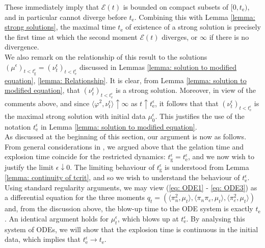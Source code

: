 \documentclass[11pt, notitlepage]{article}
\begin{document}
\begin{equation}
\end{equation} These immediately imply that $\mathcal{E}(t)$ is bounded on compact subsets of $[0, t_\mathrm{e})$, and in particular cannot diverge before $t_\mathrm{e}$. Combining this with Lemma \ref{lemma: strong solutions}, the maximal time $t_\mathrm{e}$ of existence of a strong solution is precisely the first time at which the second moment $\mathcal{E}(t)$ diverges, or $\infty$ if there is no divergence. \medskip \\ We also remark on the relationship of this result to the solutions $(\mu^\epsilon)_{t<t_\mathrm{g}^\epsilon}=(\nu^\epsilon_t)_{t<t_\mathrm{e}^\epsilon}$ discussed in Lemmas \ref{lemma: solution to modified equation}, \ref{lemma: Relationship}. It is clear, from Lemma \ref{lemma: solution to modified equation}, that $(\nu^\epsilon_t)_{t<t_\mathrm{e}^\epsilon}$ is a strong solution. Moreover, in view of the comments above, and since $\langle \varphi^2, \nu^\epsilon_t\rangle \uparrow \infty$ as $t\uparrow t_\mathrm{e}^\epsilon$, it follows that that $(\nu^{\epsilon}_t)_{t<t_\mathrm{e}^\epsilon}$ is the maximal strong solution with initial data $\mu^\epsilon_0.$ This justifies the use of the notation $t^\epsilon_\mathrm{e}$ in Lemma \ref{lemma: solution to modified equation}. \bigskip \\  As discussed at the beginning of this section, our argument is now as follows. From general considerations in \cite{N00}, we argued above that the gelation time and explosion time coincide for the restricted dynamics: $t_\mathrm{g}^\epsilon=t_\mathrm{e}^\epsilon$, and we now wish to justify the limit $\epsilon\downarrow 0$. The limiting behaviour of $t^\epsilon_\mathrm{g}$ is understood from Lemma \ref{lemma: continuity of tcrit}, and so we wish to understand the behaviour of $t_\mathrm{e}^\epsilon.$ \medskip \\  Using standard regularity arguments, we may view (\ref{eq: ODE1} - \ref{eq: ODE3}) as a differential equation for the three moments $q_t=(\langle \pi_n^2, \mu_t\rangle, \langle \pi_n \pi_e, \mu_t\rangle, \langle \pi_e^2, \mu_t\rangle)$ and, from the discussion above, the blow-up time to the ODE system is exactly $t_\mathrm{e}$. An identical argument holds for $\mu^\epsilon_t$, which blows up at $t^\epsilon_\mathrm{e}$. By analysing this system of ODEs, we will show that the explosion time is continuous in the initial data, which implies that $t^\epsilon_\mathrm{e}\rightarrow t_\mathrm{e}.$
\end{document}
